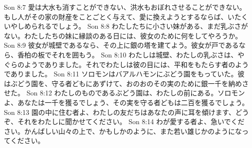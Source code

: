 Son 8:7  愛は大水も消すことができない、洪水もおぼれさせることができない。もし人がその家の財産をことごとく与えて、愛に換えようとするならば、いたくいやしめられるでしょう。
Son 8:8  わたしたちに小さい妹がある、まだ乳ぶさがない。わたしたちの妹に縁談のある日には、彼女のために何をしてやろうか。
Son 8:9  彼女が城壁であるなら、その上に銀の塔を建てよう。彼女が戸であるなら、香柏の板でそれを囲もう。
Son 8:10  わたしは城壁、わたしの乳ぶさは、やぐらのようでありました。それでわたしは彼の目には、平和をもたらす者のようでありました。
Son 8:11  ソロモンはバアルハモンにぶどう園をもっていた。彼はぶどう園を、守る者どもにあずけて、おのおのその実のために銀一千を納めさせた。
Son 8:12  わたしのものであるぶどう園は、わたしの前にある。ソロモンよ、あなたは一千を獲るでしょう、その実を守る者どもは二百を獲るでしょう。
Son 8:13  園の中に住む者よ、わたしの友だちはあなたの声に耳を傾けます、どうぞ、それをわたしに聞かせてください。
Son 8:14  わが愛する者よ、急いでください。かんばしい山々の上で、かもしかのように、また若い雄じかのようになってください。



